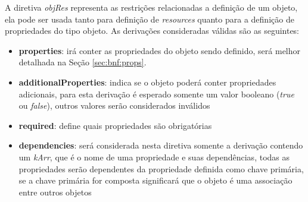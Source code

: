\label{sec:bnf:obj}
A diretiva \textit{objRes} representa as restrições relacionadas a definição de um objeto, ela pode ser usada tanto para definição de \textit{resources} quanto para a definição de propriedades do tipo objeto. As derivações consideradas válidas são as seguintes:

\begin{itemize}
    \item \textbf{properties}: irá conter as propriedades do objeto sendo definido, será melhor detalhada na Seção \ref{sec:bnf:props}.
    
    \item \textbf{additionalProperties}: indica se o objeto poderá conter propriedades adicionais, para esta derivação é esperado somente um valor booleano (\textit{true} ou \textit{false}), outros valores serão considerados inválidos
    
    \item \textbf{required}: define quais propriedades são obrigatórias
    
    \item \textbf{dependencies}: será considerada nesta diretiva somente a derivação contendo um \textit{kArr}, que é o nome de uma propriedade e suas dependências, todas as propriedades serão dependentes da propriedade definida como chave primária, se a chave primária for composta significará que o objeto é uma associação entre outros objetos
\end{itemize}

